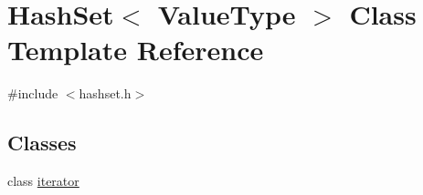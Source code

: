 \hypertarget{classHashSet}{}\section{Hash\+Set$<$ Value\+Type $>$ Class Template Reference}
\label{classHashSet}


{\ttfamily \#include $<$hashset.\+h$>$}

\subsection*{Classes}
\begin{DoxyCompactItemize}
\item 
class \mbox{\hyperlink{classHashSet_1_1iterator}{iterator}}
\end{DoxyCompactItemize}
